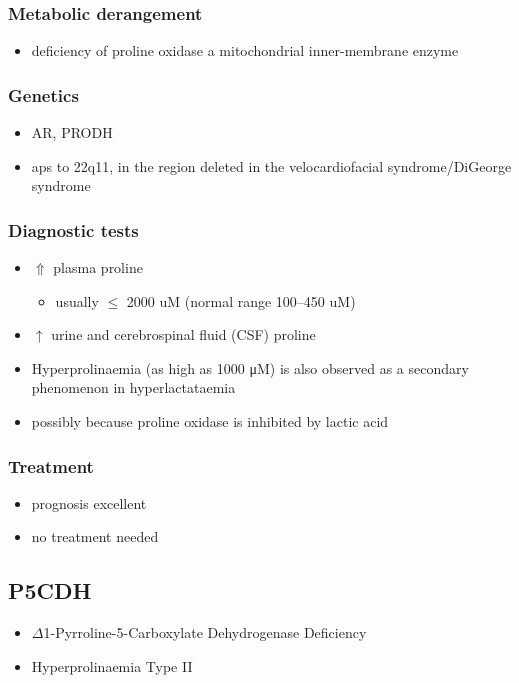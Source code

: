\documentclass{scrartcl}
\begin{document}
\subsubsection{Metabolic derangement}
\label{sec:orgf9f95dc}
\begin{itemize}
\item deficiency of proline oxidase a mitochondrial inner-membrane enzyme
\end{itemize}
\subsubsection{Genetics}
\label{sec:org615180e}
\begin{itemize}
\item AR, PRODH
\item aps to 22q11, in the region deleted in the velocardiofacial
syndrome/DiGeorge syndrome
\end{itemize}

\subsubsection{Diagnostic tests}
\label{sec:org0d712ee}
\begin{itemize}
\item \(\Uparrow\) plasma proline
\begin{itemize}
\item usually \(\le\) 2000 uM (normal range 100–450 uM)
\end{itemize}
\item \(\uparrow\) urine and cerebrospinal fluid (CSF) proline
\item Hyperprolinaemia (as high as 1000 μM) is also observed as a
secondary phenomenon in hyperlactataemia
\item possibly because proline oxidase is inhibited by lactic acid
\end{itemize}

\subsubsection{Treatment}
\label{sec:org2595812}
\begin{itemize}
\item prognosis excellent
\item no treatment needed
\end{itemize}

\subsection{P5CDH}
\label{sec:org9e596a7}
\begin{itemize}
\item \(\Delta\)1-Pyrroline-5-Carboxylate Dehydrogenase Deficiency
\item Hyperprolinaemia Type II
\end{itemize}
\end{document}
